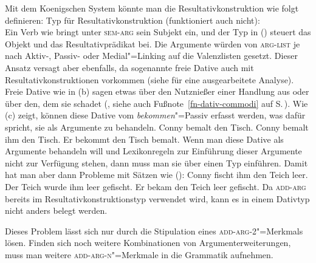 Mit dem Koenigschen System könnte man die Resultativkonstruktion wie folgt definieren:
\eas
Typ für Resultativkonstruktion (funktioniert auch nicht):\\
\zs
Ein Verb wie  bringt unter \textsc{sem-arg} sein Subjekt ein, und der
Typ in () steuert das Objekt und das Resultativprädikat bei. Die Argumente
würden von \textsc{arg-list} je nach Aktiv-, Passiv- oder Medial"=Linking
auf die Valenzlisten gesetzt. Dieser Ansatz versagt aber ebenfalls, da sogenannte freie
Dative auch mit Resultativkonstruktionen vorkommen
(siehe \citealt{MuellerLFGphrasal} für eine ausgearbeitete Analyse). Freie
Dative wie in
(b) sagen etwas über den Nutznießer einer Handlung aus oder über den, dem sie schadet
(\citealt[]{Wegener85b}, siehe auch Fußnote~\ref{fn-dativ-commodi} auf S.\,\pageref{fn-dativ-commodi}).
Wie (c) zeigt, können diese Dative vom \emph{bekommen}"=Passiv
erfasst werden, was dafür spricht, sie als Argumente zu behandeln.
\eal
\ex Conny bemalt den Tisch.
\ex Conny bemalt ihm den Tisch.
\ex Er bekommt den Tisch bemalt.
\zl
Wenn man diese Dative als Argumente behandeln will und Lexikonregeln zur Einführung
dieser Argumente nicht zur Verfügung stehen, dann muss man sie über einen Typ einführen.
Damit hat man aber dann Probleme mit Sätzen wie ():
\eal
\ex Conny fischt ihm den Teich leer.
\ex Der Teich wurde ihm leer gefischt.
\ex Er bekam den Teich leer gefischt.
\zl
Da \textsc{add-arg} bereits im Resultativkonstruktionstyp verwendet wird, kann es in einem
Dativtyp nicht anders belegt werden.

Dieses Problem lässt sich nur durch die Stipulation eines \textsc{add-arg-2}"=Merkmals lösen. Finden
sich noch weitere Kombinationen von Argumenterweiterungen, muss man weitere \textsc{add-arg-n}"=Merkmale
in die Grammatik aufnehmen.

